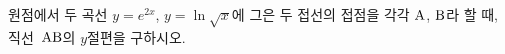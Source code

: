 원점에서 두 곡선 $y=e^{2x}$, $y=\ln\sqrt{x}$에 그은 두 접선의 접점을 각각 $\mathrm{A}$, $\mathrm{B}$라 할 때, 직선~$\mathrm{AB}$의 $y$절편을 구하시오.
